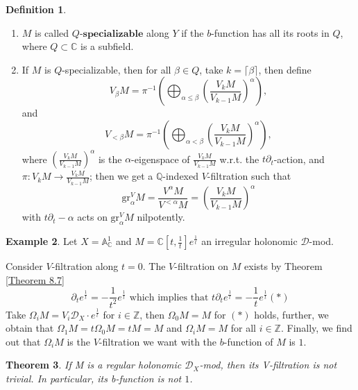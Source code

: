 \documentclass[openany]{book}
\newtheorem{theorem}{Theorem}[chapter] %
\theoremstyle{definition} %
\newtheorem{definition}[theorem]{Definition} %
\newtheorem{example}[theorem]{Example}       %
\theoremstyle{remark}
\begin{document}
\begin{definition}
    \quad

    \begin{enumerate}
        \item  $M$ is called $Q\textbf{-specializable}$ along $Y$ if the $b$-function has all its roots in $Q$, where $Q \subset \mathbb{C}$ is a subfield.
        \item If $M$ is $Q$-specializable, then for all $\beta \in Q$, take $k = \lceil \beta \rceil$, then define $$V_{\beta} M = \pi^{-1} \left( \bigoplus_{\alpha \leq \beta} \left( \frac{V_k M}{V_{k-1} M} \right)^{\alpha} \right),$$and $$V_{<\beta} M = \pi^{-1} \left( \bigoplus_{\alpha < \beta} \left( \frac{V_k M}{V_{k-1} M} \right)^{\alpha} \right),$$where $\left( \frac{V_k M}{V_{k-1} M} \right)^{\alpha}$ is the $\alpha$-eigenspace of $\frac{V_k M}{V_{k-1} M}$ w.r.t. the $t\partial_t$-action, and $\pi: V_k M \rightarrow \frac{V_k M}{V_{k-1} M}$; then we get a $\mathbb{Q}$-indexed $V$-filtration such that  $$\mathrm{gr}_{\alpha}^{V} M = \frac{V^{\alpha} M}{V^{<\alpha} M} = \left( \frac{V_k M}{V_{k-1} M} \right)^{\alpha}$$ with $t\partial_t - \alpha$ acts on $\mathrm{gr}_{\alpha}^{V} M$ nilpotently.
    \end{enumerate}
\end{definition}
\begin{example}
    Let $X=\mathbb{A}^{1}_{\mathbb{C}}$ and $M = \mathbb{C}\left[ t, \frac{1}{t} \right]e^{\frac{1}{t}}$ an irregular holonomic $\mathcal{D}$-mod.

    Consider $V$-filtration along $t = 0$. The $V$-filtration on $M$ exists by Theorem \ref{Theorem 8.7}$$\partial_t e^{\frac{1}{t}} = -\frac{1}{t^2} e^{\frac{1}{t}}\text{ which implies that }t\partial_t e^{\frac{1}{t}} = -\frac{1}{t} e^{\frac{1}{t}}(\ast)$$Take $\Omega_i M = V_i \mathcal{D}_{X} \cdot e^{\frac{1}{t}}$ for $i \in \mathbb{Z}$, then $\Omega_0 M = M$ for $(\ast)$ holds, further, we obtain that $\Omega_1 M = t \Omega_0 M = t M = M$ and $\Omega_i M = M$ for all $i\in \mathbb{Z}$. Finally, we find out that $\Omega_{i}M$ is the $V$-filtration we want with the $b$-function of $M$ is $1$.

\end{example}

\begin{theorem}
    If M is a regular holonomic $\mathcal{D}_X$-mod, then its V-filtration is not trivial. In particular, its b-function is not $1$.
\end{theorem}
\end{document}
